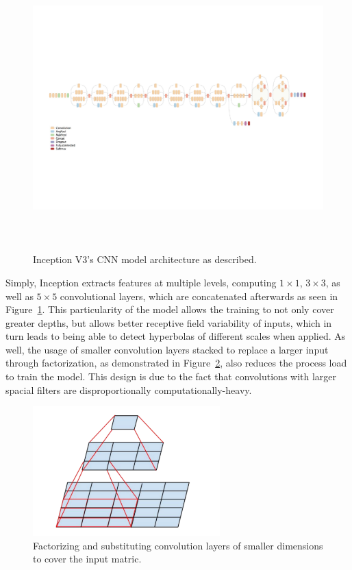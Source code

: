 \documentclass[se,blockletter]{uw-wkrpt}
\begin{document}
\begin{figure}
  \centering
  \includegraphics[height=11cm]{inception-architecture}
  \caption{Inception V3's CNN model architecture as described.~\cite{ref:}}
  \label{fig:inception-architecture}
\end{figure}

Simply, Inception extracts features at multiple levels, computing $1\times 1$, $3\times 3$, as well as $5 \times 5$ convolutional layers, which are concatenated afterwards as seen in Figure~\ref{fig:inception-architecture}. This particularity of the model allows the training to not only cover greater depths, but allows better receptive field variability of inputs, which in turn leads to being able to detect hyperbolas of different scales when applied. As well, the usage of smaller convolution layers stacked to replace a larger input through factorization, as demonstrated in Figure~\ref{fig:convolution-substitution}, also reduces the process load to train the model. This design is due to the fact that convolutions with larger spacial filters are disproportionally computationally-heavy. 

\begin{figure}
  \centering
  \includegraphics[height=5cm]{convolution-substitution}
  \caption{Factorizing and substituting convolution layers of smaller dimensions to cover the input matric.~\cite{ref:}}
  \label{fig:convolution-substitution}
\end{figure}
\end{document}

